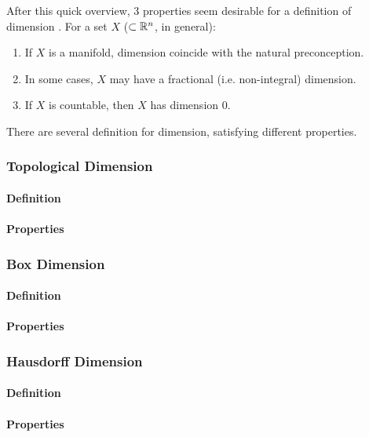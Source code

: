 After this quick overview, 3 properties seem desirable for a definition of dimension \cite{Pollicott_LFDT}.
For a set $X$ ($\subset \mathbb{R}^n$, in general):
\begin{enumerate}
	\item If $X$ is a manifold, dimension coincide with the natural preconception.
	\item In some cases, $X$ may have a fractional (i.e. non-integral) dimension.
	\item If $X$ is countable, then $X$ has dimension $0$.
\end{enumerate}
There are several definition for dimension, satisfying different properties.

\subsubsection{Topological Dimension}
\paragraph{Definition}

\paragraph{Properties}

\subsubsection{Box Dimension}
\paragraph{Definition}

\paragraph{Properties}

\subsubsection{Hausdorff Dimension}
\paragraph{Definition}

\paragraph{Properties}

